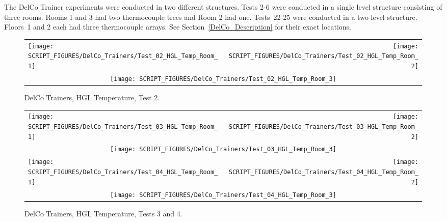 The DelCo Trainer experiments were conducted in two different structures. Tests 2-6 were conducted in a single level structure consisting of three rooms. Rooms 1 and 3 had two thermocouple trees and Room 2 had one. Tests~22-25 were conducted in a two level structure. Floors~1 and 2 each had three thermocouple arrays. See Section~\ref{DelCo_Description} for their exact locations.


\begin{figure}[!ht]
\begin{tabular*}{\textwidth}{l@{\extracolsep{\fill}}r}
\texttt{[image: SCRIPT\_FIGURES/DelCo\_Trainers/Test\_02\_HGL\_Temp\_Room\_1]} &
\texttt{[image: SCRIPT\_FIGURES/DelCo\_Trainers/Test\_02\_HGL\_Temp\_Room\_2]} \\
\multicolumn{2}{c}{\texttt{[image: SCRIPT\_FIGURES/DelCo\_Trainers/Test\_02\_HGL\_Temp\_Room\_3]}}
\end{tabular*}
\caption[DelCo Trainers, HGL Temperature, Test 2]
{DelCo Trainers, HGL Temperature, Test 2.}
\label{DelCo_HGL_1}
\end{figure}

\newpage

\begin{figure}[p]
\begin{tabular*}{\textwidth}{l@{\extracolsep{\fill}}r}
\texttt{[image: SCRIPT\_FIGURES/DelCo\_Trainers/Test\_03\_HGL\_Temp\_Room\_1]} &
\texttt{[image: SCRIPT\_FIGURES/DelCo\_Trainers/Test\_03\_HGL\_Temp\_Room\_2]} \\
\multicolumn{2}{c}{\texttt{[image: SCRIPT\_FIGURES/DelCo\_Trainers/Test\_03\_HGL\_Temp\_Room\_3]}} \\
\texttt{[image: SCRIPT\_FIGURES/DelCo\_Trainers/Test\_04\_HGL\_Temp\_Room\_1]} &
\texttt{[image: SCRIPT\_FIGURES/DelCo\_Trainers/Test\_04\_HGL\_Temp\_Room\_2]} \\
\multicolumn{2}{c}{\texttt{[image: SCRIPT\_FIGURES/DelCo\_Trainers/Test\_04\_HGL\_Temp\_Room\_3]}} \\

\end{tabular*}
\caption[DelCo Trainers, HGL Temperature, Tests 3 and 4]
{DelCo Trainers, HGL Temperature, Tests 3 and 4.}
\label{DelCo_HGL_2}
\end{figure}

